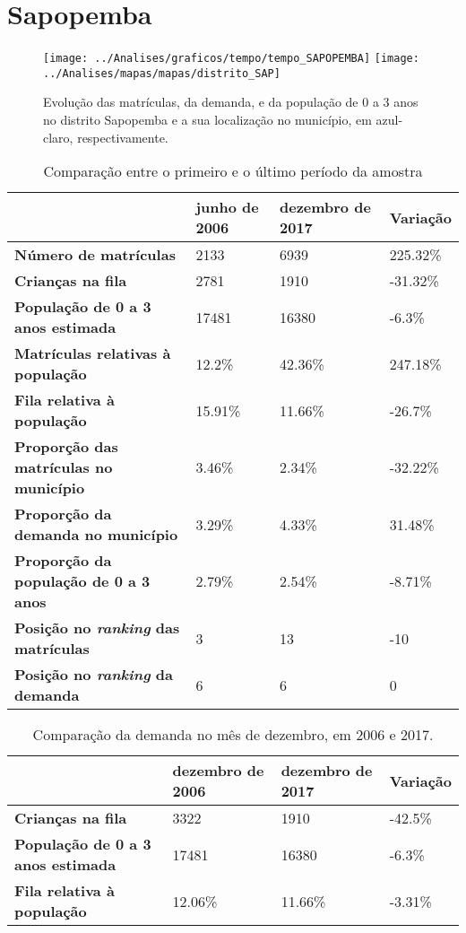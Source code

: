 \section{Sapopemba}
\begin{figure}[H]
\centering
\texttt{[image: ../Analises/graficos/tempo/tempo\_SAPOPEMBA]}
\texttt{[image: ../Analises/mapas/mapas/distrito\_SAP]}
\caption{Evolução das matrículas, da demanda, e da população de 0 a 3 anos no distrito Sapopemba e a sua localização no município, em azul-claro, respectivamente.}
\end{figure}
\begin{table}[H]
\begin{tabular}{l|l|l|l}
\textbf{}                                      & \textbf{junho de 2006}       & \textbf{dezembro de 2017}    & \textbf{Variação} \\ \hline
\textbf{Número de matrículas}                  & 2133 & 6939 & 225.32\% \\ \hline
\textbf{Crianças na fila}                      & 2781 & 1910 & -31.32\% \\ \hline
\textbf{População de 0 a 3 anos estimada}      & 17481 & 16380 & -6.3\% \\ \hline
\textbf{Matrículas relativas à população}      & 12.2\% & 42.36\% & 247.18\% \\ \hline
\textbf{Fila relativa à população}             & 15.91\% & 11.66\% & -26.7\% \\ \hline
\textbf{Proporção das matrículas no município} & 3.46\% & 2.34\% & -32.22\% \\ \hline
\textbf{Proporção da demanda no município}     & 3.29\% & 4.33\% & 31.48\% \\ \hline
\textbf{Proporção da população de 0 a 3 anos}  & 2.79\% & 2.54\% & -8.71\% \\ \hline
\textbf{Posição no \textit{ranking} das matrículas}     & 3 & 13 & -10 \\ \hline
\textbf{Posição no \textit{ranking} da demanda}         & 6 & 6 & 0 \\ 
\end{tabular}
\caption{Comparação entre o primeiro e o último período da amostra}
\end{table}
\begin{table}[H]
\begin{tabular}{l|l|l|l}
\textbf{}                                 & \textbf{dezembro de 2006} & \textbf{dezembro de 2017} & \textbf{Variação} \\ \hline
\textbf{Crianças na fila}                      & 3322 & 1910 & -42.5\% \\ \hline
\textbf{População de 0 a 3 anos estimada}      & 17481 & 16380 & -6.3\% \\ \hline
\textbf{Fila relativa à população}             & 12.06\% & 11.66\% & -3.31\% \\
\end{tabular}
\caption{Comparação da demanda no mês de dezembro, em 2006 e 2017.}
\end{table}
